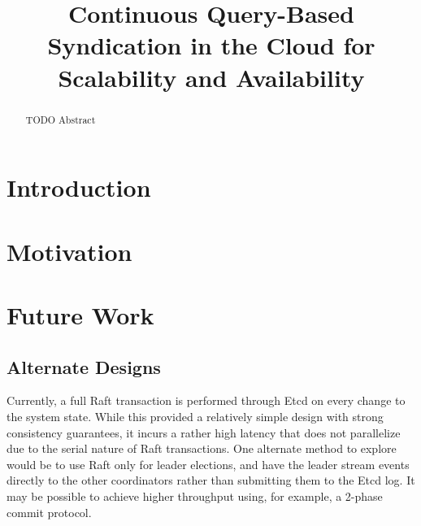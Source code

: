 \documentclass[conference]{IEEEtran}
\begin{document}
\title{Continuous Query-Based Syndication in the Cloud for Scalability and Availability}

\author{
\and
{}
}

\maketitle

\begin{abstract}
TODO Abstract
\end{abstract}

\section{Introduction} %


\section{Motivation} 








\section{Future Work}

\subsection{Alternate Designs}
\label{subsec:alternate_designs}


Currently, a full Raft transaction is performed through Etcd on every change to the system state.
While this provided a relatively simple design with strong consistency guarantees, it incurs a rather high latency that does not parallelize due to the serial nature of Raft transactions.
One alternate method to explore would be to use Raft only for leader elections, and have the leader stream events directly to the other coordinators rather than submitting them to the Etcd log.
It may be possible to achieve higher throughput using, for example, a 2-phase commit protocol. 
\end{document}
